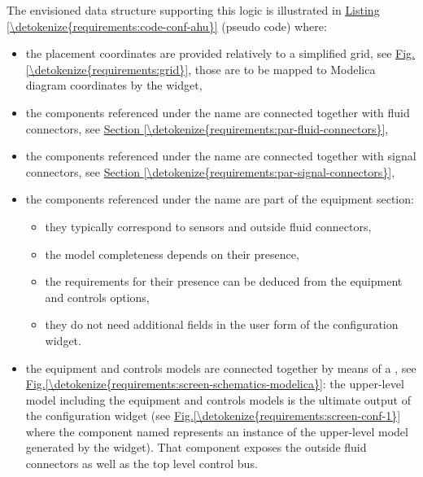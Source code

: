 \documentclass[letterpaper,10pt, openany,english]{sphinxmanual}
\begin{document}
The envisioned data structure supporting this logic is illustrated in \hyperref[\detokenize{requirements:code-conf-ahu}]{Listing \ref{\detokenize{requirements:code-conf-ahu}}} (pseudo code) where:
\begin{itemize}
\item {} 
the placement coordinates are provided relatively to a simplified grid, see \hyperref[\detokenize{requirements:grid}]{Fig.\@ \ref{\detokenize{requirements:grid}}}, those are to be mapped to Modelica diagram coordinates by the widget,

\item {} 
the components referenced under the  name are connected together with fluid connectors, see \hyperref[\detokenize{requirements:par-fluid-connectors}]{Section \ref{\detokenize{requirements:par-fluid-connectors}}},

\item {} 
the components referenced under the  name are connected together with signal connectors, see \hyperref[\detokenize{requirements:par-signal-connectors}]{Section \ref{\detokenize{requirements:par-signal-connectors}}},

\item {} 
the components referenced under the  name are part of the equipment section:
\begin{itemize}
\item {} 
they typically correspond to sensors and outside fluid connectors,

\item {} 
the model completeness depends on their presence,

\item {} 
the requirements for their presence can be deduced from the equipment and controls options,

\item {} 
they do not need additional fields in the user form of the configuration widget.

\end{itemize}

\item {} 
the equipment and controls models are connected together by means of a , see \hyperref[\detokenize{requirements:screen-schematics-modelica}]{Fig.\@ \ref{\detokenize{requirements:screen-schematics-modelica}}}: the upper-level model including the equipment and controls models is the ultimate output of the configuration widget (see \hyperref[\detokenize{requirements:screen-conf-1}]{Fig.\@ \ref{\detokenize{requirements:screen-conf-1}}} where the component named  represents an instance of the upper-level model  generated by the widget). That component exposes the outside fluid connectors as well as the top level control bus.

\end{itemize}
\end{document}
